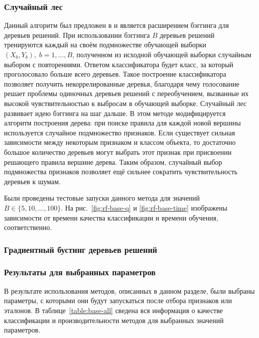 \subsubsection{Случайный лес}
Данный алгоритм был предложен в \cite{ho} и является расширением бэггинга для деревьев решений. При использовании бэггинга \(B\) деревьев решений тренируются каждый на своём подмножестве обучающей выборки \(\left(X_b, Y_b\right),\;b=1,\dotsc,B\), полученном из исходной обучающей выборки случайным выбором с повторениями. Ответом классификатора будет класс, за который проголосовало больше всего деревьев. Такое построение классификатора позволяет получить некоррелированные деревья, благодаря чему голосование решает проблемы одиночных деревьев решений с переобучением, вызванные их высокой чувствительностью к выбросам в обучающей выборке. Случайный лес развивает идею бэггинга на шаг дальше. В этом методе модифицируется алгоритм построения дерева: при поиске правила для каждой новой вершины используется случайное подмножество признаков. Если существует сильная зависимости между некоторым признаком и классом объекта, то достаточно большое количество деревьев могут выбрать этот признак при присвоении решающего правила вершине дерева. Таким образом, случайный выбор подмножества признаков позволяет ещё сильнее сократить чувствительность деревьев к шумам.

Были проведены тестовые запуски данного метода для значений \(B\in\{5,10,\dotsc,100\}\). На рис.~\ref{fig:rf-base-q} и \ref{fig:rf-base-time} изображены зависимости от времени качества классификации и времени обучения, соответственно.

\subsubsection{Градиентный бустинг деревьев решений}
\subsubsection{Результаты для выбранных параметров}
В результате использования методов, описанных в данном разделе, были выбраны параметры, с которыми они будут запускаться после отбора признаков или эталонов. В таблице~\ref{table:base-all} сведена вся информация о качестве классификации и производительности методов для выбранных значений параметров.

